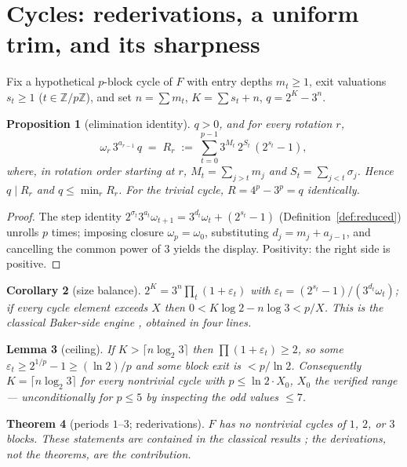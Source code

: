 \documentclass[11pt]{article}
\newtheorem{theorem}{Theorem}[section]
\newtheorem{proposition}[theorem]{Proposition}
\newtheorem{lemma}[theorem]{Lemma}
\newtheorem{corollary}[theorem]{Corollary}
\theoremstyle{remark}
\newcommand{\Z}{\mathbb{Z}}
\newcommand{\w}{\omega}
\newcommand{\LL}{\log_2 3}
\begin{document}
\section{Cycles: rederivations, a uniform trim, and its sharpness}\label{sec:cycles}

Fix a hypothetical $p$-block cycle of $F$ with entry depths $m_t \ge 1$, exit valuations $s_t \ge 1$ ($t \in \Z/p\Z$), and set $n = \sum m_t$, $K = \sum s_t + n$, $q = 2^K - 3^n$.

\begin{proposition}[elimination identity]\label{prop:elim}
$q > 0$, and for every rotation $r$,
\[ \w_r\, 3^{a_{r-1}}\, q \;=\; R_r \;:=\; \sum_{t=0}^{p-1} 3^{M_t}\, 2^{S_t}\,(2^{s_t}-1), \]
where, in rotation order starting at $r$, $M_t = \sum_{j>t} m_j$ and $S_t = \sum_{j<t}\sigma_j$. Hence $q \mid R_r$ and $q \le \min_r R_r$. For the trivial cycle, $R = 4^p - 3^p = q$ identically.
\end{proposition}

\begin{proof}
The step identity $2^{\sigma_t}3^{a_t}\w_{t+1} = 3^{d_t}\w_t + (2^{s_t}-1)$ (Definition~\ref{def:reduced}) unrolls $p$ times; imposing closure $\w_p = \w_0$, substituting $d_j = m_j + a_{j-1}$, and cancelling the common power of $3$ yields the display. Positivity: the right side is positive.
\end{proof}

\begin{corollary}[size balance]\label{cor:size}
$2^K = 3^n \prod_t (1 + \varepsilon_t)$ with $\varepsilon_t = (2^{s_t}-1)/(3^{d_t}\w_t)$; if every cycle element exceeds $X$ then $0 < K\log 2 - n\log 3 < p/X$. This is the classical Baker-side engine \cite{eliahou}, obtained in four lines.
\end{corollary}

\begin{lemma}[ceiling]\label{lem:ceiling}
If $K > \lceil n\LL \rceil$ then $\prod(1+\varepsilon_t) \ge 2$, so some $\varepsilon_t \ge 2^{1/p}-1 \ge (\ln 2)/p$ and some block exit is $< p/\ln 2$. Consequently $K = \lceil n \LL\rceil$ for every nontrivial cycle with $p \le \ln 2 \cdot X_0$, $X_0$ the verified range \cite{barina} --- unconditionally for $p\le5$ by inspecting the odd values $\le 7$.
\end{lemma}

\begin{theorem}[periods $1$--$3$; rederivations]\label{thm:smallp}
$F$ has no nontrivial cycles of $1$, $2$, or $3$ blocks. These statements are contained in the classical results \cite{steiner,sdw,hercher}; the derivations, not the theorems, are the contribution.
\end{theorem}
\end{document}

